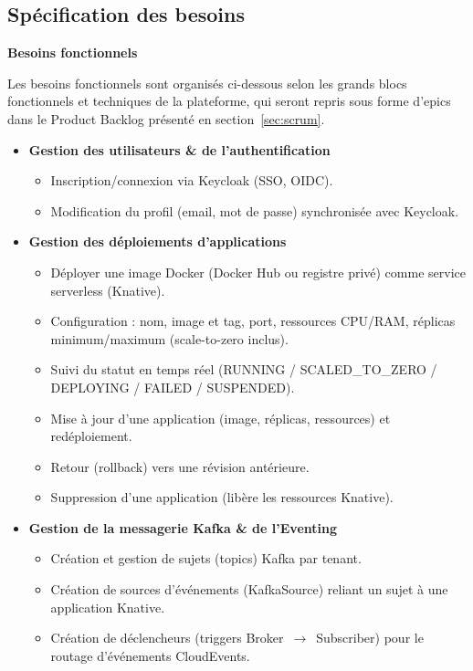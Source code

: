 \subsection{Spécification des besoins}
\label{sec:besoins-fonctionnels}

\medskip
\textbf{Besoins fonctionnels}
\medskip

Les besoins fonctionnels sont organisés ci-dessous selon les grands blocs fonctionnels et techniques de la plateforme, qui seront repris sous forme d'epics dans le Product Backlog présenté en section~\ref{sec:scrum}.

\begin{itemize}
    \item \textbf{Gestion des utilisateurs \& de l'authentification}
    \begin{itemize}[label=--]
        \item Inscription/connexion via Keycloak (SSO, OIDC).
        \item Modification du profil (email, mot de passe) synchronisée avec Keycloak.
    \end{itemize}

    \item \textbf{Gestion des déploiements d'applications}
    \begin{itemize}[label=--]
        \item Déployer une image Docker (Docker Hub ou registre privé) comme service serverless (Knative).
        \item Configuration : nom, image et tag, port, ressources CPU/RAM, réplicas minimum/maximum (scale-to-zero inclus).
        \item Suivi du statut en temps réel (RUNNING / SCALED\_TO\_ZERO / DEPLOYING / FAILED / SUSPENDED).
        \item Mise à jour d'une application (image, réplicas, ressources) et redéploiement.
        \item Retour (rollback) vers une révision antérieure.
        \item Suppression d'une application (libère les ressources Knative).
    \end{itemize}

    \item \textbf{Gestion de la messagerie Kafka \& de l'Eventing}
    \begin{itemize}[label=--]
        \item Création et gestion de sujets (topics) Kafka par tenant.
        \item Création de sources d'événements (KafkaSource) reliant un sujet à une application Knative.
        \item Création de déclencheurs (triggers Broker~$\rightarrow$~Subscriber) pour le routage d'événements CloudEvents.
    \end{itemize}


\end{itemize}
